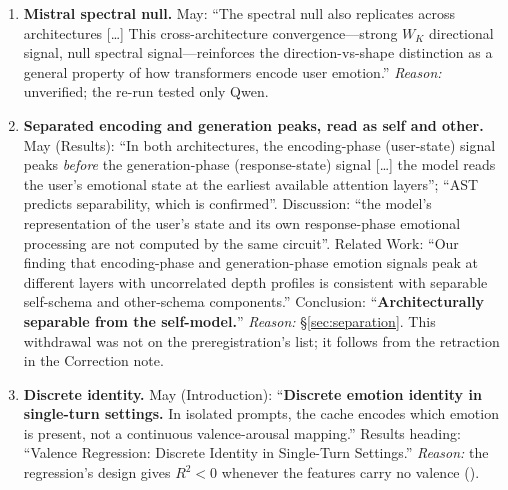 \begin{enumerate}[leftmargin=*]
    \item \textbf{Mistral spectral null.} May: ``The spectral null also replicates across architectures [\ldots] This cross-architecture convergence---strong $W_K$ directional signal, null spectral signal---reinforces the direction-vs-shape distinction as a general property of how transformers encode user emotion.'' \emph{Reason:} unverified; the re-run tested only Qwen.
    \item \label{app:item:separation}\textbf{Separated encoding and generation peaks, read as self and other.} May (Results): ``In both architectures, the encoding-phase (user-state) signal peaks \emph{before} the generation-phase (response-state) signal [\ldots] the model reads the user's emotional state at the earliest available attention layers''; ``AST predicts separability, which is confirmed''. Discussion: ``the model's representation of the user's state and its own response-phase emotional processing are not computed by the same circuit''. Related Work: ``Our finding that encoding-phase and generation-phase emotion signals peak at different layers with uncorrelated depth profiles is consistent with separable self-schema and other-schema components.'' Conclusion: ``\textbf{Architecturally separable from the self-model.}'' \emph{Reason:} \S\ref{sec:separation}. This withdrawal was not on the preregistration's list; it follows from the retraction in the Correction note.
    \item \label{app:item:discrete}\textbf{Discrete identity.} May (Introduction): ``\textbf{Discrete emotion identity in single-turn settings.} In isolated prompts, the cache encodes which emotion is present, not a continuous valence-arousal mapping.'' Results heading: ``Valence Regression: Discrete Identity in Single-Turn Settings.'' \emph{Reason:} the regression's design gives $R^2 < 0$ whenever the features carry no valence ().


\end{enumerate}
